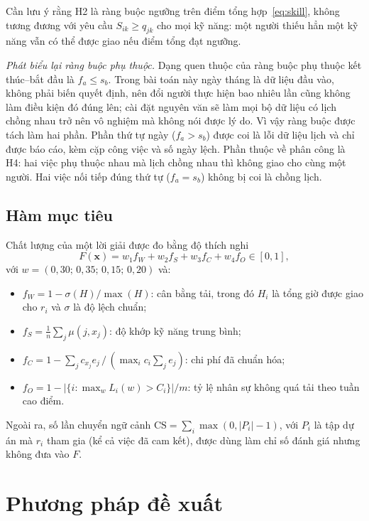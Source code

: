 \documentclass{IEEEtran}
\begin{document}
Cần lưu ý rằng H2 là ràng buộc ngưỡng trên điểm tổng hợp~\eqref{eq:skill}, không tương đương với yêu cầu $S_{ik}\ge q_{jk}$ cho mọi kỹ năng: một người thiếu hẳn một kỹ năng vẫn có thể được giao nếu điểm tổng đạt ngưỡng.

\textit{Phát biểu lại ràng buộc phụ thuộc.} Dạng quen thuộc của ràng buộc phụ thuộc kết thúc--bắt đầu là $f_a\le s_b$. Trong bài toán này ngày tháng là dữ liệu đầu vào, không phải biến quyết định, nên đổi người thực hiện bao nhiêu lần cũng không làm điều kiện đó đúng lên; cài đặt nguyên văn sẽ làm mọi bộ dữ liệu có lịch chồng nhau trở nên vô nghiệm mà không nói được lý do. Vì vậy ràng buộc được tách làm hai phần. Phần thứ tự ngày ($f_a>s_b$) được coi là lỗi dữ liệu lịch và chỉ được báo cáo, kèm cặp công việc và số ngày lệch. Phần thuộc về phân công là H4: hai việc phụ thuộc nhau mà lịch chồng nhau thì không giao cho cùng một người. Hai việc nối tiếp đúng thứ tự ($f_a=s_b$) không bị coi là chồng lịch.

\subsection{Hàm mục tiêu}

Chất lượng của một lời giải được đo bằng độ thích nghi
\begin{equation}
F(\mathbf{x})=w_1 f_W+w_2 f_S+w_3 f_C+w_4 f_O\in[0,1],
\label{eq:fitness}
\end{equation}
với $w=(0{,}30;\,0{,}35;\,0{,}15;\,0{,}20)$ và:
\begin{itemize}
  \item $f_W=1-\sigma(H)/\max(H)$: cân bằng tải, trong đó $H_i$ là tổng giờ được giao cho $r_i$ và $\sigma$ là độ lệch chuẩn;
  \item $f_S=\frac{1}{n}\sum_j \mu(j,x_j)$: độ khớp kỹ năng trung bình;
  \item $f_C=1-\sum_j c_{x_j}e_j\,/\,(\max_i c_i\sum_j e_j)$: chi phí đã chuẩn hóa;
  \item $f_O=1-|\{i:\max_w L_i(w)>C_i\}|/m$: tỷ lệ nhân sự không quá tải theo tuần cao điểm.
\end{itemize}
Ngoài ra, số lần chuyển ngữ cảnh $\mathrm{CS}=\sum_i\max(0,|P_i|-1)$, với $P_i$ là tập dự án mà $r_i$ tham gia (kể cả việc đã cam kết), được dùng làm chỉ số đánh giá nhưng không đưa vào $F$.

\section{Phương pháp đề xuất}
\label{sec:method}
\end{document}
